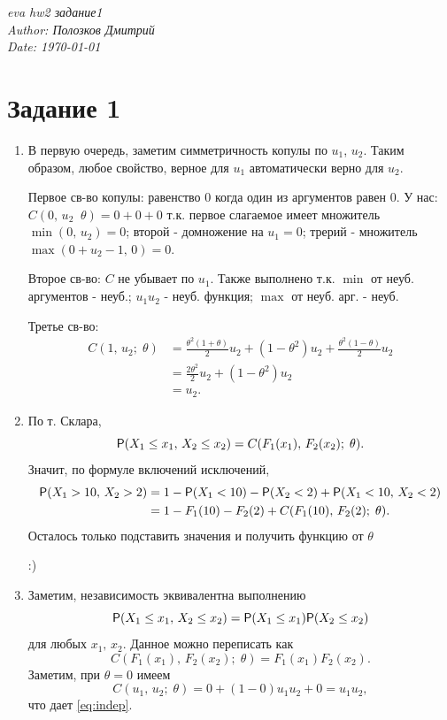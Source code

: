 \documentclass[12pt]{article}
\theoremstyle{remark}
\newcommand{\todayYYMMDD}{\the\year-\the\month-\the\day}
\begin{document}
\hfill
\begin{center}
\textit{eva hw2 задание1}\\
\textit{Author: Полозков Дмитрий}\\
\textit{Date: \today}
\end{center}


\section*{Задание 1}

\begin{enumerate}
    \item 
    В первую очередь, заметим симметричность копулы по $u_1$, $u_2$.
    Таким образом, любое свойство, верное для $u_1$ автоматически верно для $u_2$.

    Первое св-во копулы: равенство 0 когда один из аргументов равен 0.
    У нас: $C(0,\,u_2\;\;\theta)=0+0+0$ т.к. первое слагаемое имеет множитель $\min(0,\,u_2)=0$; второй - домножение на $u_1=0$; трерий - множитель $\max(0+u_2-1,\,0)=0$.

    Второе св-во: $C$ не убывает по $u_1$. 
    Также выполнено т.к. $\min$ от неуб. аргументов - неуб.; $u_1u_2$ - неуб. функция; $\max$ от неуб. арг. - неуб.

    Третье св-во: 
    \begin{align*}
        C(1,\,u_2;\;\theta)&=\frac{\theta^2(1+\theta)}{2}u_2+(1-\theta^2)u_2+\frac{\theta^2(1-\theta)}{2}u_2\\
        &=\frac{2\theta^2}{2}u_2+(1-\theta^2)u_2\\
        &=u_2.
    \end{align*}
    \item 
    По т. Склара, 
    \[
        \P(X_1\le x_1,\,X_2\le x_2)=C(F_1(x_1),\,F_2(x_2);\;\theta).
    \]
    Значит, по формуле включений исключений,
    \begin{align*}
        \P(X_1>10,\,X_2>2)&=1-\P(X_1<10)-\P(X_2<2)+\P(X_1<10,\,X_2<2)\\
        &=1-F_1(10)-F_2(2)+C(F_1(10),\,F_2(2);\;\theta). 
    \end{align*}
    Осталось только подставить значения и получить функцию от $\theta$
    
    :)
    \item
    Заметим, независимость эквивалентна выполнению
    \[
        \P(X_1\le x_1,\,X_2\le x_2)=\P(X_1\le x_1)\P(X_2\le x_2)
    \]
    для любых $x_1,\,x_2$.
    Данное можно переписать как
    \begin{equation}
        \label{eq:indep}
        C(F_1(x_1),\,F_2(x_2);\;\theta)=F_1(x_1)F_2(x_2).
    \end{equation}
    Заметим, при $\theta=0$ имеем 
    \[
        C(u_1,\,u_2;\;\theta)=0+(1-0)u_1u_2+0=u_1u_2,
    \]
    что дает \eqref{eq:indep}.
\end{enumerate}
\end{document}
